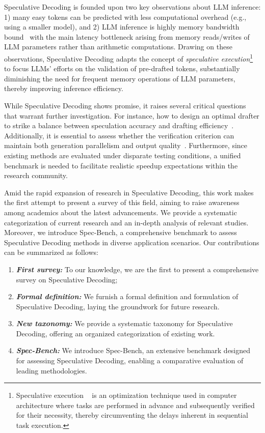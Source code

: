 Speculative Decoding is founded upon two key observations about LLM inference: 1) many easy tokens can be predicted with less computational overhead (e.g., using a smaller model), and 2) LLM inference is highly memory bandwidth bound~\cite{Patterson:2004latencybandwith, Shazeer:2019memorybandwith} with the main latency bottleneck arising from memory reads/writes of LLM parameters rather than arithmetic computations. Drawing on these observations, Speculative Decoding adapts the concept of \textit{speculative execution}\footnote{Speculative execution ~\cite{Burton:1985specexe, John:2012specexe} is an optimization technique used in computer architecture where tasks are performed in advance and subsequently verified for their necessity, thereby circumventing the delays inherent in sequential task execution.} to focus LLMs' efforts on the validation of pre-drafted tokens, substantially diminishing the need for frequent memory operations of LLM parameters, thereby improving inference efficiency. 

While Speculative Decoding shows promise, it raises several critical questions that warrant further investigation. For instance, how to design an optimal drafter to strike a balance between speculation accuracy and drafting efficiency~\cite{xia:2022specdec, Zhou:2023distillspec, Li:2024eagle}. Additionally, it is essential to assess whether the verification criterion can maintain both generation parallelism and output quality~\cite{Miao:2023specinfer, medusa}. Furthermore, since existing methods are evaluated under disparate testing conditions, a unified benchmark is needed to facilitate realistic speedup expectations within the research community.

Amid the rapid expansion of research in Speculative Decoding, this work makes the first attempt to present a survey of this field, aiming to raise awareness among academics about the latest advancements. We provide a systematic categorization of current research and an in-depth analysis of relevant studies. Moreover, we introduce Spec-Bench, a comprehensive benchmark to assess Speculative Decoding methods in diverse application scenarios. Our contributions can be summarized as follows:

\begin{enumerate}[label={(\arabic*)}]
    \item \textbf{\textit{First survey:}} To our knowledge, we are the first to present a comprehensive survey on Speculative Decoding;
    \item \textbf{\textit{Formal definition:}} We furnish a formal definition and formulation of Speculative Decoding, laying the groundwork for future research.
    \item \textbf{\textit{New taxonomy:}} We provide a systematic taxonomy for Speculative Decoding, offering an organized categorization of existing work.
    \item \textbf{\textit{Spec-Bench:}} We introduce Spec-Bench, an extensive benchmark designed for assessing Speculative Decoding, enabling a comparative evaluation of leading methodologies.
\end{enumerate}

